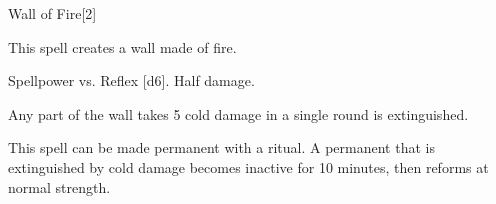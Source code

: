 \begin{spellsection}{Wall of Fire}[2]
    \begin{spellheader}
    \end{spellheader}
    \begin{spellcontent}
        \begin{spelltargetinginfo}
        \end{spelltargetinginfo}
        \begin{spelleffects}
            \spelleffect This spell creates a wall made of fire.
            \spelldur \durshort
        \end{spelleffects}
    \end{spellcontent}
    \begin{spellsubcontent}
        \begin{spelltargetinginfo}
        \end{spelltargetinginfo}
        \begin{spelleffects}
            \begin{spellattack}{Spellpower vs. Reflex}
                \spellsuccess {}[d6].
                \spellfailure Half damage.
            \end{spellattack}
        \end{spelleffects}
    \end{spellsubcontent}
    \begin{spellfooter}
        \spellnotes Any part of the wall takes 5 cold damage in a single round is extinguished.

        This spell can be made permanent with a  ritual. A permanent  that is extinguished by cold damage becomes inactive for 10 minutes, then reforms at normal strength.
        \miscastexplode
    \end{spellfooter}
\end{spellsection}

